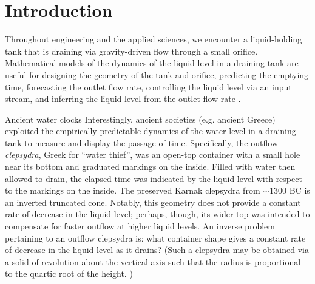 \documentclass[openacc]{rsproca_new}%
\begin{document}
\rsbreak


\section{Introduction}
Throughout engineering and the applied sciences, we encounter a liquid-holding tank that is draining via gravity-driven flow through a small orifice.
Mathematical models of the dynamics of the liquid level in a draining tank are useful for designing the geometry of the tank and orifice, predicting the emptying time, forecasting the outlet flow rate, controlling the liquid level via an input stream, and inferring the liquid level from the outlet flow rate \cite{d2021torricelli,seborg2016process,groetsch1993inverse,groetsch1999inverse}.

\begin{mytcbox}[label=box:waterclocks, breakable]{Ancient water clocks}
Interestingly, ancient societies (e.g. ancient Greece) exploited the empirically predictable dynamics of the water level in a draining tank to measure and display the passage of time.
Specifically, the outflow \emph{clepsydra}, Greek for ``water thief'', was an open-top container with a small hole near its bottom and graduated markings on the inside. 
Filled with water then allowed to drain, the elapsed time was indicated by the liquid level with respect to the markings on the inside. \cite{bedini1962compartmented,hwang2021historical,ritner2016oriental,hejun1987research,schomberg2018karnak,mills1982newton}
The preserved Karnak clepsydra from $\sim$1300 BC \cite{schomberg2018karnak} is an inverted truncated cone. Notably, this geometry does not provide a constant rate of decrease in the liquid level; perhaps, though, its wider top was intended to compensate for faster outflow at higher liquid levels. An inverse problem pertaining to an outflow clepsydra is: what container shape gives a constant rate of decrease in the liquid level as it drains?
(Such a clepsydra may be obtained via a solid of revolution about the vertical axis such that the radius is proportional to the quartic root of the height. \cite{mills1982newton,d2021torricelli})
\end{mytcbox}
\end{document}
